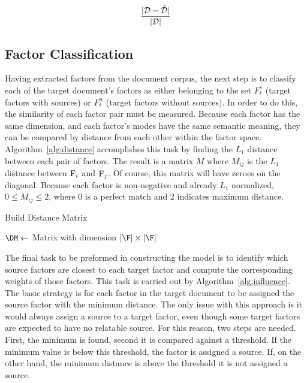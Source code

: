 \documentclass[../ut-dissertation.tex]{subfiles}
\begin{document}
\begin{equation}\label{eq:error_ratio}
  \displaystyle\frac{|\mathcal{D} - \mathcal{\hat{D}}|}{|\mathcal{D}|}
\end{equation}

\subsection{Factor Classification}
Having extracted factors from the document corpus, the next step is to
classify each of the target document's factors as either belonging to
the set $F^s_t$ (target factors with sources) or $F^n_t$ (target
factors without sources).  In order to do this, the similarity of each
factor pair must be measured.  Because each factor has the same
dimension, and each factor's modes have the same semantic meaning,
they can be compared by distance from each other within the factor
space.  Algorithm~\ref{alg:distance} accomplishes this task by finding
the $L_1$ distance between each pair of factors.  The result is a
matrix $M$ where $M_{ij}$ is the $L_1$ distance between $\mathrm{F}_i$
and $\mathrm{F}_j$.  Of course, this matrix will have zeroes on the
diagonal.  Because each factor is non-negative and already $L_1$
normalized, $0 \leq M_{ij} \leq 2$, where 0 is a perfect match and 2
indicates maximum distance.  
\begin{algorithm}
  \caption{Build Distance Matrix}
  \label{alg:distance}
   
  \Input{\F}
  \Output{\DM}
  \BlankLine
  $\DM \leftarrow $ Matrix with dimension $|\F| \times |\F|$\;
  \Return{\DM}
\end{algorithm}

The final task to be preformed in constructing the model is to
identify which source factors are closest to each target factor and
compute the corresponding weights of those factors.  This task is
carried out by Algorithm~\ref{alg:influence}.  The basic strategy is
for each factor in the target document to be assigned the source
factor with the minimum distance.  The only issue with this approach
is it would always assign a source to a target factor, even though
some target factors are expected to have no relatable source.  For
this reason, two steps are needed.  First, the minimum is found,
second it is compared against a threshold.  If the minimum value is
below this threshold, the factor is assigned a source.  If, on the
other hand, the minimum distance is above the threshold it is not
assigned a source.
\end{document}
